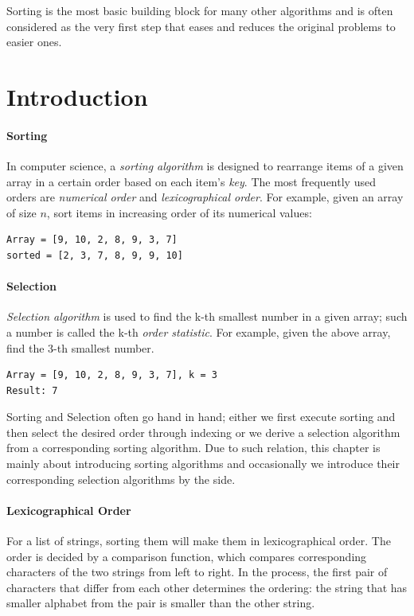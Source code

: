 \documentclass[../main.tex]{subfiles}
\begin{document}
Sorting is the most basic building block for many other algorithms and is often considered as the very first step that eases and reduces the original problems to easier ones. 
\section{Introduction}
\paragraph{Sorting} In computer science, a \textit{sorting algorithm} is designed to rearrange items of a given array in a certain order based on each item's \textit{key}. The most frequently used orders are \textit{numerical order} and \textit{lexicographical order}. For example, given an array of size $n$, sort items in increasing order of its numerical values:
\begin{lstlisting}[numbers=none]
Array = [9, 10, 2, 8, 9, 3, 7]
sorted = [2, 3, 7, 8, 9, 9, 10]
\end{lstlisting}
\paragraph{Selection} \textit{Selection algorithm} is used to  find the k-th smallest number  in a given array; such a number is called the k-th \textit{order statistic}. For example, given the above array, find the 3-th smallest number.
\begin{lstlisting}[numbers=none]
Array = [9, 10, 2, 8, 9, 3, 7], k = 3
Result: 7
\end{lstlisting}
Sorting and Selection often go hand in hand; either we first execute sorting and then select the desired order through indexing or we derive a selection algorithm from a corresponding sorting algorithm. Due to such relation, this chapter is mainly about introducing sorting algorithms and occasionally we introduce their corresponding selection algorithms by the side. 

\paragraph{Lexicographical Order} For a list of strings, sorting them will make them in lexicographical order. The order is decided by a comparison function, which compares corresponding characters of the two strings from left to right. In the process,  the first  pair of characters that differ from each other  determines the ordering: the string that has smaller alphabet from the pair is smaller than the other string. 
\end{document}
